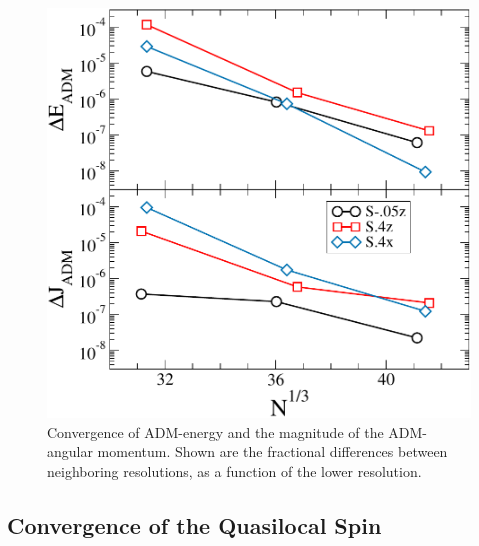 \begin{figure}
\includegraphics[width=0.95\columnwidth]{chap2/EADMConvergence}
\caption[Convergence of ADM-energy and of the ADM-angular momentum magnitude.]{{\label{fig:EADMConvergence}} Convergence of ADM-energy and the magnitude of the ADM-angular momentum. Shown are the fractional differences between neighboring resolutions, as a function of the lower resolution.
}
\end{figure}




















\subsection{Convergence of the Quasilocal Spin}

